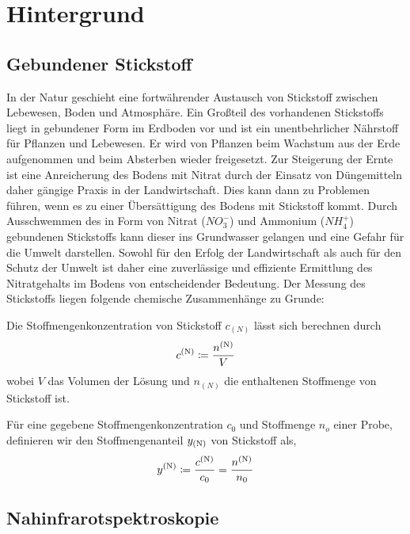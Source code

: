 \section{Hintergrund}
\label{sec:Hintergrund}

	\subsection{Gebundener Stickstoff}
	\label{ssec:Gebundener Stickstoff}

	In der Natur geschieht eine fortwährender Austausch von Stickstoff zwischen Lebewesen, Boden und Atmosphäre.
	Ein Großteil des vorhandenen Stickstoffs liegt in gebundener Form im Erdboden vor und ist ein unentbehrlicher Nährstoff für Pflanzen und Lebewesen.
	Er wird von Pflanzen beim Wachstum aus der Erde aufgenommen und beim Absterben wieder freigesetzt.
    Zur Steigerung der Ernte ist eine Anreicherung des Bodens mit Nitrat durch der Einsatz von Düngemitteln daher gängige Praxis in der Landwirtschaft.\cite{Umweltbundesamt2017}
    Dies kann dann zu Problemen führen, wenn es zu einer Übersättigung des Bodens mit Stickstoff kommt.
    Durch Ausschwemmen des in Form von Nitrat ($NO_3^-$) und Ammonium ($NH_4^+$) gebundenen Stickstoffs kann dieser ins Grundwasser gelangen und eine Gefahr für die Umwelt darstellen.
    Sowohl für den Erfolg der Landwirtschaft als auch für den Schutz der Umwelt ist daher eine zuverlässige und effiziente Ermittlung des Nitratgehalts im Bodens von entscheidender Bedeutung.
    Der Messung des Stickstoffs liegen folgende chemische Zusammenhänge zu Grunde:


    Die Stoffmengenkonzentration von Stickstoff $c_{(N)}$ lässt sich berechnen durch
    	\[
			c^{\mathrm{(N)}} \coloneqq \frac{n^{\mathrm{(N)}}}{V}
		\]
		wobei $V$ das Volumen der Lösung und $n_{(N)}$ die enthaltenen Stoffmenge von Stickstoff ist.

    Für eine gegebene Stoffmengenkonzentration $c_0$ und Stoffmenge $n_o$ einer Probe, definieren wir den Stoffmengenanteil $y_{\mathrm{(N)}}$ von Stickstoff als,
        \[
			y^{\mathrm{(N)}} \coloneqq \frac{c^{\mathrm{(N)}}}{c_0} = \frac{n^{\mathrm{(N)}}}{n_0}
		\]


	\subsection{Nahinfrarotspektroskopie}
	\label{ssec:Nahinfrarotspek}

